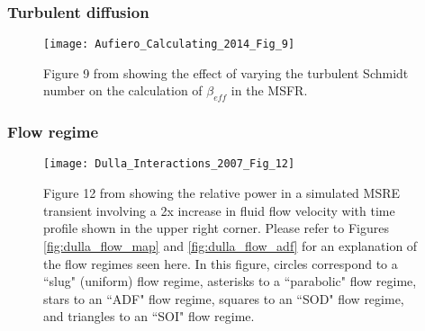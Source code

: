 \documentclass{beamer}
\begin{document}
\begin{frame}
\frametitle{Turbulent diffusion}

\begin{figure}[H]
   \centering
   \texttt{[image: Aufiero\_Calculating\_2014\_Fig\_9]}
   \caption{Figure 9 from \cite{aufiero_calculating_2014} showing the effect of varying
   the turbulent Schmidt number on the calculation of $\beta_{eff}$ in the MSFR.}
   \label{fig:aufiero_sc}
\end{figure}

\end{frame}

\begin{frame}
\frametitle{Flow regime}

\begin{figure}[H]
   \centering
   \texttt{[image: Dulla\_Interactions\_2007\_Fig\_12]}
   \caption{Figure 12 from \cite{dulla_interactions_2007} showing the relative power in a
   simulated MSRE transient involving a 2x increase in fluid flow velocity with time profile
   shown in the upper right corner. Please refer to
   Figures \ref{fig:dulla_flow_map} and \ref{fig:dulla_flow_adf} for an
   explanation of the flow regimes seen here. In this figure, circles correspond
   to a ``slug" (uniform) flow regime, asterisks to a ``parabolic" flow regime,
   stars to an
   ``ADF" flow regime, squares to an ``SOD" flow regime, and triangles to an
   ``SOI" flow regime.} 
   \label{fig:dulla_flow_regimes}
\end{figure}

\end{frame}
\end{document}
